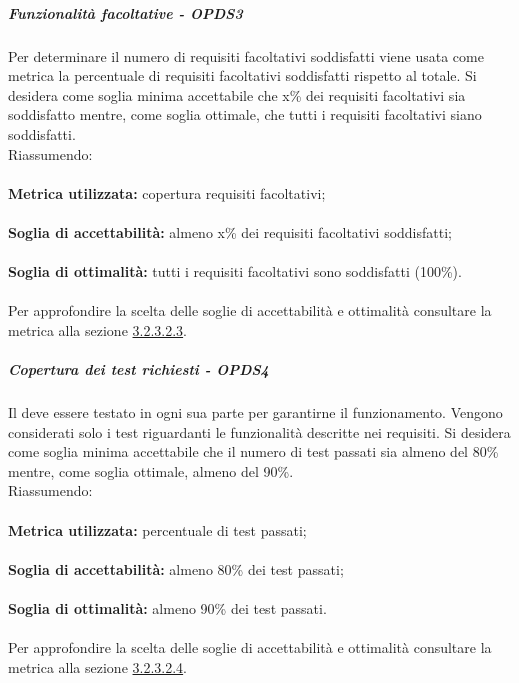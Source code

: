 \documentclass[PianoDiQualifica.tex]{subfiles}
\begin{document}
				
				\subparagraph{Funzionalità facoltative - OPDS3}
				Per determinare il numero di requisiti facoltativi soddisfatti viene usata come metrica la percentuale di requisiti facoltativi soddisfatti rispetto al totale.
				Si desidera come soglia minima accettabile che x\% dei requisiti facoltativi sia soddisfatto mentre, come soglia ottimale, che tutti i requisiti facoltativi siano soddisfatti. \\
				Riassumendo: \\ \\
				\textbf{Metrica utilizzata:} copertura requisiti facoltativi;\\ \\
				\textbf{Soglia di accettabilità:} almeno x\% dei requisiti facoltativi soddisfatti; \\ \\
				\textbf{Soglia di ottimalità:} tutti i requisiti facoltativi sono soddisfatti (100\%). \\ \\
				Per approfondire la scelta delle soglie di accettabilità e ottimalità consultare la metrica alla sezione \hyperlink{req_facoltativi}{3.2.3.2.3}.
				
				\subparagraph{Copertura dei test richiesti - OPDS4}
				Il  deve essere testato in ogni sua parte per garantirne il funzionamento. Vengono considerati solo i test riguardanti le funzionalità descritte nei requisiti.
				Si desidera come soglia minima accettabile che il numero di test passati sia almeno del 80\% mentre, come soglia ottimale, almeno del 90\%. \\
				Riassumendo: \\ \\
				\textbf{Metrica utilizzata:} percentuale di test passati;\\ \\
				\textbf{Soglia di accettabilità:} almeno 80\% dei test passati; \\ \\
				\textbf{Soglia di ottimalità:} almeno 90\% dei test passati. \\ \\
				Per approfondire la scelta delle soglie di accettabilità e ottimalità consultare la metrica alla sezione \hyperlink{test_passati}{3.2.3.2.4}.
				
\end{document}
